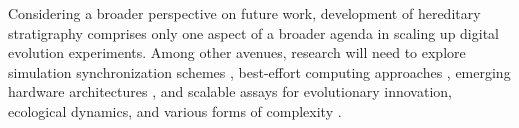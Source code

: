 Considering a broader perspective on future work, development of hereditary stratigraphy comprises only one aspect of a broader agenda in scaling up digital evolution experiments.
Among other avenues, research will need to explore simulation synchronization schemes \citep{fujimoto1990parallel}, best-effort computing approaches \citep{moreno2022best,ackley2020best}, emerging hardware architectures \citep{moreno2024trackable,chan2018lenia,heinemann2008artificial}, and scalable assays for evolutionary innovation, ecological dynamics, and various forms of complexity \citep{bedau1998classification,dolson2019modes,moreno2024methods,moreno2024case,moreno2024ecology}.
